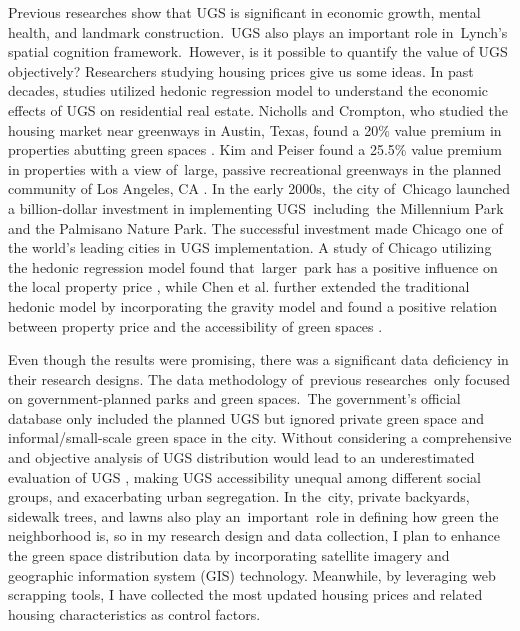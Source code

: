 Previous researches show that UGS is significant in economic growth, mental health, and landmark construction. UGS also plays an important role in Lynch’s spatial cognition framework. However, is it possible to quantify the value of UGS objectively? Researchers studying housing prices give us some ideas. In past decades, studies utilized hedonic regression model to understand the economic effects of UGS on residential real estate. Nicholls and Crompton, who studied the housing market near greenways in Austin, Texas, found a 20\% value premium in properties abutting green spaces \parencite{nicholls_impact_2005}. Kim and Peiser found a 25.5\% value premium in properties with a view of large, passive recreational greenways in the planned community of Los Angeles, CA \parencite{kim_economic_2018}. In the early 2000s, the city of Chicago launched a billion-dollar investment in implementing UGS including the Millennium Park and the Palmisano Nature Park. The successful investment made Chicago one of the world’s leading cities in UGS implementation. A study of Chicago utilizing the hedonic regression model found that larger park has a positive influence on the local property price \parencite{shaikh_economic_2011}, while Chen et al. further extended the traditional hedonic model by incorporating the gravity model and found a positive relation between property price and the accessibility of green spaces \parencite{chen_spatial_2022}. 

Even though the results were promising, there was a significant data deficiency in their research designs. The data methodology of previous researches only focused on government-planned parks and green spaces. The government's official database only included the planned UGS but ignored private green space and informal/small-scale green space in the city. Without considering a comprehensive and objective analysis of UGS distribution would lead to an underestimated evaluation of UGS \parencite{feltynowski_challenges_2018}, making UGS accessibility unequal among different social groups, and exacerbating urban segregation. In the city, private backyards, sidewalk trees, and lawns also play an important role in defining how green the neighborhood is, so in my research design and data collection, I plan to enhance the green space distribution data by incorporating satellite imagery and geographic information system (GIS) technology. Meanwhile, by leveraging web scrapping tools, I have collected the most updated housing prices and related housing characteristics as control factors.

